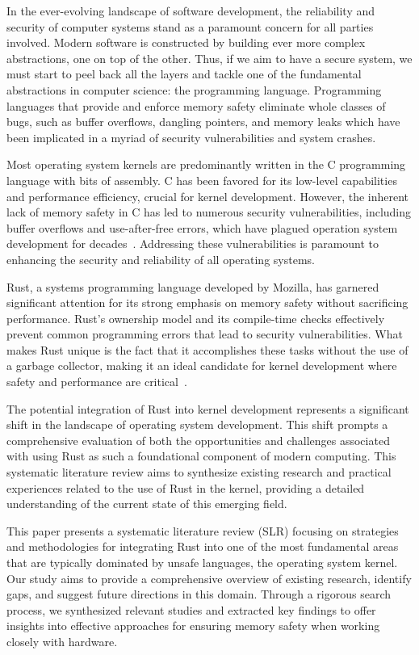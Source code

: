 \documentclass[sigconf,review,anonymous]{acmart}
\begin{document}
In the ever-evolving landscape of software development, the reliability and security of computer
systems stand as a paramount concern for all parties involved. Modern software is constructed by
building ever more complex abstractions, one on top of the other. Thus, if we aim to have a secure
system, we must start to peel back all the layers and tackle one of the fundamental abstractions in
computer science: the programming language. Programming languages that provide and enforce memory
safety eliminate whole classes of bugs, such as buffer overflows, dangling pointers, and memory leaks
which have been implicated in a myriad of security vulnerabilities and system crashes.

Most operating system kernels are predominantly written in the C programming language with bits of
assembly. C has been favored for its low-level capabilities and performance efficiency, crucial for
kernel development. However, the inherent lack of memory safety in C has led to numerous security
vulnerabilities, including buffer overflows and use-after-free errors, which have plagued operation
system development for decades~\cite{noauthor_2019-bf}. Addressing these vulnerabilities is
paramount to enhancing the security and reliability of all operating systems.

Rust, a systems programming language developed by Mozilla, has garnered significant attention for
its strong emphasis on memory safety without sacrificing performance. Rust's ownership model and its
compile-time checks effectively prevent common programming errors that lead to security
vulnerabilities. What makes Rust unique is the fact that it accomplishes these tasks without the use
of a garbage collector, making it an ideal candidate for kernel development where safety and
performance are critical~\cite{noauthor_2024-id}.



The potential integration of Rust into kernel development represents a significant shift in the
landscape of operating system development. This shift prompts a comprehensive evaluation of both the
opportunities and challenges associated with using Rust as such a foundational component of modern
computing. This systematic literature review aims to synthesize existing research and practical
experiences related to the use of Rust in the kernel, providing a detailed understanding of
the current state of this emerging field.

This paper presents a systematic literature review (SLR) focusing on strategies and methodologies
for integrating Rust into one of the most fundamental areas that are typically dominated by unsafe
languages, the operating system kernel. Our study aims to provide a comprehensive overview of
existing research, identify gaps, and suggest future directions in this domain. Through a rigorous
search process, we synthesized relevant studies and extracted key findings to offer insights into
effective approaches for ensuring memory safety when working closely with hardware.
\end{document}
